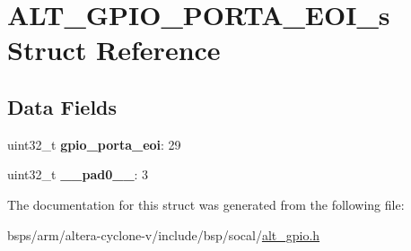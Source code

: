 \hypertarget{structALT__GPIO__PORTA__EOI__s}{}\section{A\+L\+T\+\_\+\+G\+P\+I\+O\+\_\+\+P\+O\+R\+T\+A\+\_\+\+E\+O\+I\+\_\+s Struct Reference}
\label{structALT__GPIO__PORTA__EOI__s}
\subsection*{Data Fields}
\begin{DoxyCompactItemize}
\item 
\mbox{\label{structALT__GPIO__PORTA__EOI__s_a460f2c171ea21ed52c8e7f8d24d742ca}} 
uint32\+\_\+t {\bfseries gpio\+\_\+porta\+\_\+eoi}\+: 29
\item 
\mbox{\label{structALT__GPIO__PORTA__EOI__s_ac49501098f53f2abc08b882cf10544c8}} 
uint32\+\_\+t {\bfseries \+\_\+\+\_\+pad0\+\_\+\+\_\+}\+: 3
\end{DoxyCompactItemize}


The documentation for this struct was generated from the following file\+:\begin{DoxyCompactItemize}
\item 
bsps/arm/altera-\/cyclone-\/v/include/bsp/socal/\mbox{\hyperlink{alt__gpio_8h}{alt\+\_\+gpio.\+h}}\end{DoxyCompactItemize}
